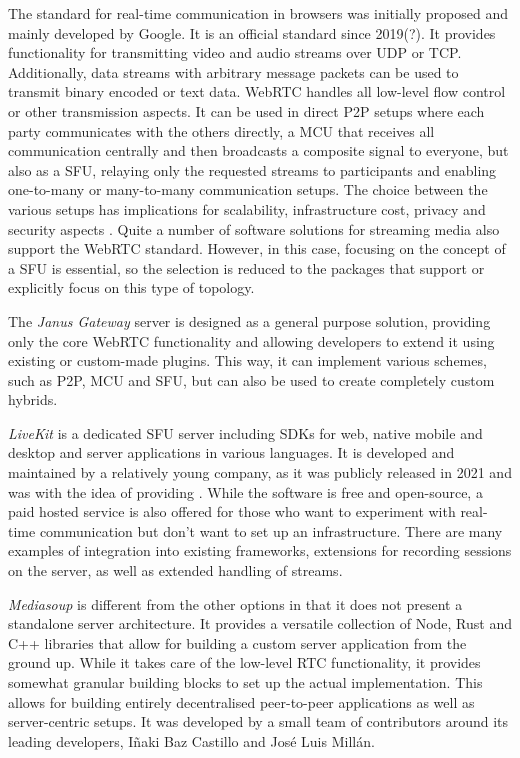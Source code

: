 The standard for real-time communication in browsers was initially proposed and mainly developed by Google. It is an official standard since 2019(?). It provides functionality for transmitting video and audio streams over \ac{UDP} or \ac{TCP}. Additionally, data streams with arbitrary message packets can be used to transmit binary encoded or text data. WebRTC handles all low-level flow control or other transmission aspects. It can be used in direct \ac{P2P} setups where each party communicates with the others directly, a \ac{MCU} that receives all communication centrally and then broadcasts a composite signal to everyone, but also as a \ac{SFU}, relaying only the requested streams to participants and enabling one-to-many or many-to-many communication setups. The choice between the various setups has implications for scalability, infrastructure cost, privacy and security aspects \parencite{webRtcArchitectures}. Quite a number of software solutions for streaming media also support the WebRTC standard. However, in this case, focusing on the concept of a \ac{SFU} is essential, so the selection is reduced to the packages that support or explicitly focus on this type of topology.



The \emph{Janus Gateway} server is designed as a general purpose solution, providing only the core \ac{WebRTC} functionality and allowing developers to extend it using existing or custom-made plugins. This way, it can implement various schemes, such as \ac{P2P}, \ac{MCU} and \ac{SFU}, but can also be used to create completely custom hybrids.

\emph{LiveKit} is a dedicated \ac{SFU} server including \ac{SDK}s for web, native mobile and desktop and server applications in various languages. It is developed and maintained by a relatively young company, as it was publicly released in 2021 and was  with the idea of providing  \parencite{livekitAbout}. While the software is free and open-source, a paid hosted service is also offered for those who want to experiment with real-time communication but don't want to set up an infrastructure. There are many examples of integration into existing frameworks, extensions for recording sessions on the server, as well as extended handling of streams.

\emph{Mediasoup} is different from the other options in that it does not present a standalone server architecture. It provides a versatile collection of Node, Rust and C++ libraries that allow for building a custom server application from the ground up. While it takes care of the low-level \ac{RTC} functionality, it provides somewhat granular building blocks to set up the actual implementation. This allows for building entirely decentralised peer-to-peer applications as well as server-centric setups. It was developed by a small team of contributors around its leading developers, Iñaki Baz Castillo and José Luis Millán.

